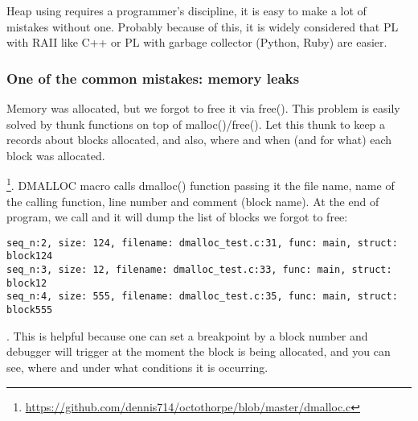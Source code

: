 {Heap using requires a programmer's discipline, it is easy to make a lot
of mistakes without one}.
{Probably because of this, it is widely considered that \ac{PL} with 
\ac{RAII} like C++
or \ac{PL} with garbage collector (Python, Ruby) are easier}.

\subsubsection{
{One of the common mistakes: memory leaks}}

{Memory was allocated, but we forgot to free it via} free().
{This problem is easily solved by thunk functions on top of
malloc()/free()}.
{Let this thunk to keep a records about blocks allocated, and also,
where and when (and for what) each block was allocated}.

\footnote{\url{https://github.com/dennis714/octothorpe/blob/master/dmalloc.c}}. 
{DMALLOC macro calls dmalloc() function passing it the file name, name of the calling function,
line number and comment (block name)}.
{At the end of program, we call}
 
{and it will dump the list of blocks we forgot to free}:

\begin{lstlisting}
seq_n:2, size: 124, filename: dmalloc_test.c:31, func: main, struct: block124
seq_n:3, size: 12, filename: dmalloc_test.c:33, func: main, struct: block12
seq_n:4, size: 555, filename: dmalloc_test.c:35, func: main, struct: block555
\end{lstlisting}

.
{This is helpful because one can set a breakpoint by a block number and debugger will trigger at the moment
the block is being allocated, and you can see, where and under what conditions it is occurring}.

